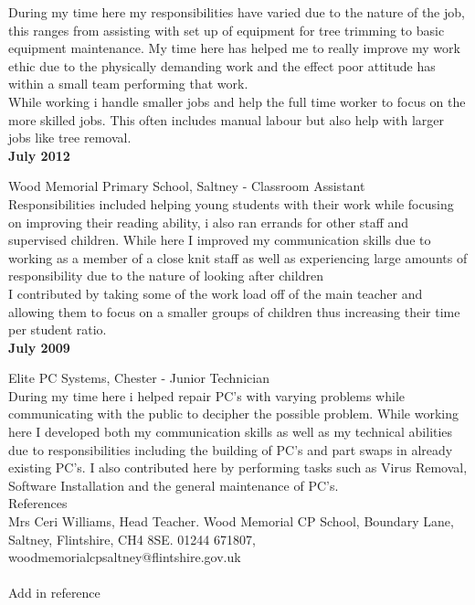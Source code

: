 \documentclass[10pt,a4paper]{article}
\begin{document}
\noindent
During my time here my responsibilities have varied due to the nature of the job, this ranges from assisting with set up of equipment for tree trimming to basic equipment maintenance. My time here has helped me to really improve my work ethic due to the physically demanding work and the effect poor attitude has within a small team performing that work. \\

\noindent
While working i handle smaller jobs and help the full time worker to focus on the more skilled jobs. This often includes manual labour but also help with larger jobs like tree removal. \\

\noindent
\textbf{July 2012}

\noindent
Wood Memorial Primary School, Saltney - Classroom Assistant\\

\noindent
Responsibilities included helping young students with their work while focusing on improving their reading ability, i also ran errands for other staff and supervised children. While here I improved my communication skills due to working as a member of a close knit staff as well as experiencing large amounts of responsibility due to the nature of looking after children\\

\noindent
I contributed by taking some of the work load off of the main teacher and allowing them to focus on a smaller groups of children thus increasing their time per student ratio.\\

\noindent
\textbf{July 2009}

\noindent
Elite PC Systems, Chester - Junior Technician \\

\noindent
During my time here i helped  repair PC's with varying problems while communicating with the public to decipher the possible problem. While working here I developed both my communication skills as well as my technical abilities due to responsibilities including the building of PC's and part swaps in already existing PC's.
I also contributed here by performing tasks such as Virus Removal, Software Installation and the general maintenance of PC's.\\

\Large	
\noindent
References\\
\normalsize
Mrs Ceri Williams, Head Teacher. Wood Memorial CP School, Boundary Lane, Saltney, Flintshire, CH4 8SE. 01244 671807, wood\textunderscore memorial\textunderscore cp\textunderscore saltney@flintshire.gov.uk \\
\vspace{0.1cm}\\
\noindent
Add in reference
\end{document}
